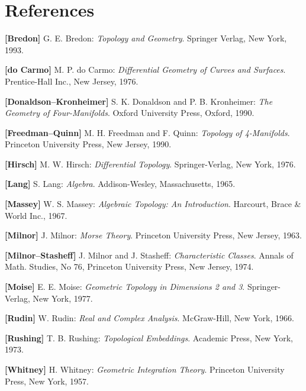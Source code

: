 \chapter*{References}

\textbf{[Bredon]} G. E. Bredon: \textit{Topology and Geometry}. Springer Verlag, New York, 1993.

\textbf{[do Carmo]} M. P. do Carmo: \textit{Differential Geometry of Curves and Surfaces}. Prentice-Hall Inc., New Jersey, 1976.

\textbf{[Donaldson--Kronheimer]} S. K. Donaldson and P. B. Kronheimer: \textit{The Geometry of Four-Manifolds}. Oxford University Press, Oxford, 1990.

\textbf{[Freedman--Quinn]} M. H. Freedman and F. Quinn: \textit{Topology of 4-Manifolds}. Princeton University Press, New Jersey, 1990.

\textbf{[Hirsch]} M. W. Hirsch: \textit{Differential Topology}. Springer-Verlag, New York, 1976.

\textbf{[Lang]} S. Lang: \textit{Algebra}. Addison-Wesley, Massachusetts, 1965.

\textbf{[Massey]} W. S. Massey: \textit{Algebraic Topology: An Introduction}. Harcourt, Brace \& World Inc., 1967.

\textbf{[Milnor]} J. Milnor: \textit{Morse Theory}. Princeton University Press, New Jersey, 1963.

\textbf{[Milnor--Stasheff]} J. Milnor and J. Stasheff: \textit{Characteristic Classes}. Annals of Math. Studies, No 76, Princeton University Press, New Jersey, 1974.

\textbf{[Moise]} E. E. Moise: \textit{Geometric Topology in Dimensions 2 and 3}. Springer-Verlag, New York, 1977.

\textbf{[Rudin]} W. Rudin: \textit{Real and Complex Analysis}. McGraw-Hill, New York, 1966.

\textbf{[Rushing]} T. B. Rushing: \textit{Topological Embeddings}. Academic Press, New York, 1973.

\textbf{[Whitney]} H. Whitney: \textit{Geometric Integration Theory}. Princeton University Press, New York, 1957.

